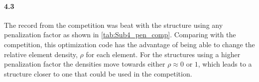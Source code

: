 \paragraph{4.3}
The record from the competition was beat with the structure using any penalization factor as shown in \cref{tab:Sub4_pen_comp}. Comparing with the competition, this optimization code has the advantage of being able to change the relative element density, $\rho$ for each element. For the structures using a higher penalization factor the densities move towards either $\rho \approx 0$ or $1$, which leads to a structure closer to one that could be used in the competition. 
